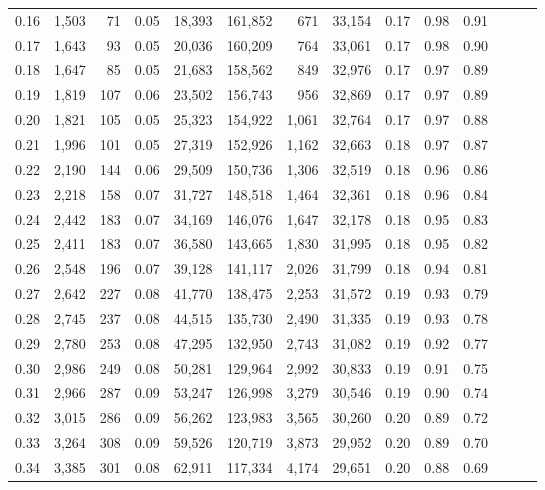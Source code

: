 \begin{tabular}{rrrrrrrrrrrrrr}
0.16 &  1,503 &   71 &  0.05 &   18,393 &  161,852 &     671 &  33,154 &  0.17 &  0.98 &      0.91 \\
0.17 &  1,643 &   93 &  0.05 &   20,036 &  160,209 &     764 &  33,061 &  0.17 &  0.98 &      0.90 \\
0.18 &  1,647 &   85 &  0.05 &   21,683 &  158,562 &     849 &  32,976 &  0.17 &  0.97 &      0.89 \\
0.19 &  1,819 &  107 &  0.06 &   23,502 &  156,743 &     956 &  32,869 &  0.17 &  0.97 &      0.89 \\
0.20 &  1,821 &  105 &  0.05 &   25,323 &  154,922 &   1,061 &  32,764 &  0.17 &  0.97 &      0.88 \\
0.21 &  1,996 &  101 &  0.05 &   27,319 &  152,926 &   1,162 &  32,663 &  0.18 &  0.97 &      0.87 \\
0.22 &  2,190 &  144 &  0.06 &   29,509 &  150,736 &   1,306 &  32,519 &  0.18 &  0.96 &      0.86 \\
0.23 &  2,218 &  158 &  0.07 &   31,727 &  148,518 &   1,464 &  32,361 &  0.18 &  0.96 &      0.84 \\
0.24 &  2,442 &  183 &  0.07 &   34,169 &  146,076 &   1,647 &  32,178 &  0.18 &  0.95 &      0.83 \\
0.25 &  2,411 &  183 &  0.07 &   36,580 &  143,665 &   1,830 &  31,995 &  0.18 &  0.95 &      0.82 \\
0.26 &  2,548 &  196 &  0.07 &   39,128 &  141,117 &   2,026 &  31,799 &  0.18 &  0.94 &      0.81 \\
0.27 &  2,642 &  227 &  0.08 &   41,770 &  138,475 &   2,253 &  31,572 &  0.19 &  0.93 &      0.79 \\
0.28 &  2,745 &  237 &  0.08 &   44,515 &  135,730 &   2,490 &  31,335 &  0.19 &  0.93 &      0.78 \\
0.29 &  2,780 &  253 &  0.08 &   47,295 &  132,950 &   2,743 &  31,082 &  0.19 &  0.92 &      0.77 \\
0.30 &  2,986 &  249 &  0.08 &   50,281 &  129,964 &   2,992 &  30,833 &  0.19 &  0.91 &      0.75 \\
0.31 &  2,966 &  287 &  0.09 &   53,247 &  126,998 &   3,279 &  30,546 &  0.19 &  0.90 &      0.74 \\
0.32 &  3,015 &  286 &  0.09 &   56,262 &  123,983 &   3,565 &  30,260 &  0.20 &  0.89 &      0.72 \\
0.33 &  3,264 &  308 &  0.09 &   59,526 &  120,719 &   3,873 &  29,952 &  0.20 &  0.89 &      0.70 \\
0.34 &  3,385 &  301 &  0.08 &   62,911 &  117,334 &   4,174 &  29,651 &  0.20 &  0.88 &      0.69 \\

\end{tabular}
